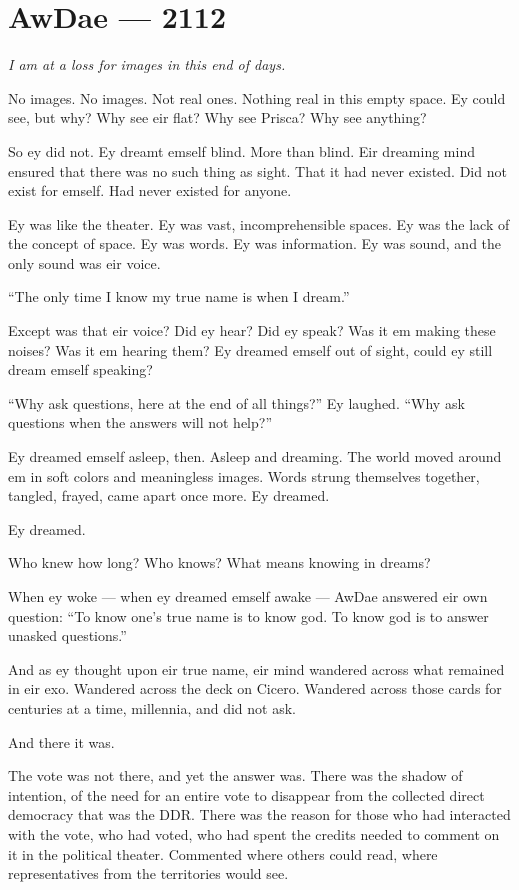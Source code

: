 \hypertarget{rj-brewster-2112}{%
\chapter*{AwDae — 2112}\label{rj-brewster-2112}}

\emph{I am at a loss for images in this end of days.}

No images. No images. Not real ones. Nothing real in this empty space. Ey could see, but why? Why see eir flat? Why see Prisca? Why see anything?

So ey did not. Ey dreamt emself blind. More than blind. Eir dreaming mind ensured that there was no such thing as sight. That it had never existed. Did not exist for emself. Had never existed for anyone.

Ey was like the theater. Ey was vast, incomprehensible spaces. Ey was the lack of the concept of space. Ey was words. Ey was information. Ey was sound, and the only sound was eir voice.

``The only time I know my true name is when I dream.''

Except was that eir voice? Did ey hear? Did ey speak? Was it em making these noises? Was it em hearing them? Ey dreamed emself out of sight, could ey still dream emself speaking?

``Why ask questions, here at the end of all things?'' Ey laughed. ``Why ask questions when the answers will not help?''

Ey dreamed emself asleep, then. Asleep and dreaming. The world moved around em in soft colors and meaningless images. Words strung themselves together, tangled, frayed, came apart once more. Ey dreamed.

Ey dreamed.

Who knew how long? Who knows? What means knowing in dreams?

When ey woke — when ey dreamed emself awake — AwDae answered eir own question: ``To know one's true name is to know god. To know god is to answer unasked questions.''

And as ey thought upon eir true name, eir mind wandered across what remained in eir exo. Wandered across the deck on Cicero. Wandered across those cards for centuries at a time, millennia, and did not ask.

And there it was.

The vote was not there, and yet the answer was. There was the shadow of intention, of the need for an entire vote to disappear from the collected direct democracy that was the DDR. There was the reason for those who had interacted with the vote, who had voted, who had spent the credits needed to comment on it in the political theater. Commented where others could read, where representatives from the territories would see.

